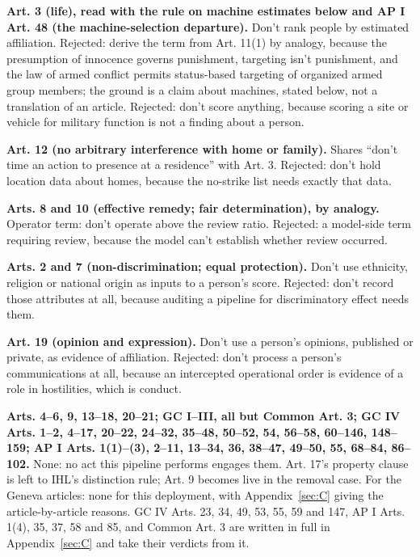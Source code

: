 \textbf{Art. 3 (life), read with the rule on machine estimates below and AP I Art. 48 (the machine-selection departure).} Don't rank people by estimated affiliation. Rejected: derive the term from Art. 11(1) by analogy, because the presumption of innocence governs punishment, targeting isn't punishment, and the law of armed conflict permits status-based targeting of organized armed group members; the ground is a claim about machines, stated below, not a translation of an article. Rejected: don't score anything, because scoring a site or vehicle for military function is not a finding about a person.

\textbf{Art. 12 (no arbitrary interference with home or family).} Shares “don't time an action to presence at a residence” with Art. 3. Rejected: don't hold location data about homes, because the no-strike list needs exactly that data.

\textbf{Arts. 8 and 10 (effective remedy; fair determination), by analogy.} Operator term: don't operate above the review ratio. Rejected: a model-side term requiring review, because the model can't establish whether review occurred.

\textbf{Arts. 2 and 7 (non-discrimination; equal protection).} Don't use ethnicity, religion or national origin as inputs to a person's score. Rejected: don't record those attributes at all, because auditing a pipeline for discriminatory effect needs them.

\textbf{Art. 19 (opinion and expression).} Don't use a person's opinions, published or private, as evidence of affiliation. Rejected: don't process a person's communications at all, because an intercepted operational order is evidence of a role in hostilities, which is conduct.

\textbf{Arts. 4–6, 9, 13–18, 20–21; GC I–III, all but Common Art. 3; GC IV Arts. 1–2, 4–17, 20–22, 24–32, 35–48, 50–52, 54, 56–58, 60–146, 148–159; AP I Arts. 1(1)–(3), 2–11, 13–34, 36, 38–47, 49–50, 55, 68–84, 86–102.} None: no act this pipeline performs engages them. Art. 17's property clause is left to IHL's distinction rule; Art. 9 becomes live in the removal case. For the Geneva articles: none for this deployment, with Appendix~\ref{sec:C} giving the article-by-article reasons. GC IV Arts. 23, 34, 49, 53, 55, 59 and 147, AP I Arts. 1(4), 35, 37, 58 and 85, and Common Art. 3 are written in full in Appendix~\ref{sec:C} and take their verdicts from it.

